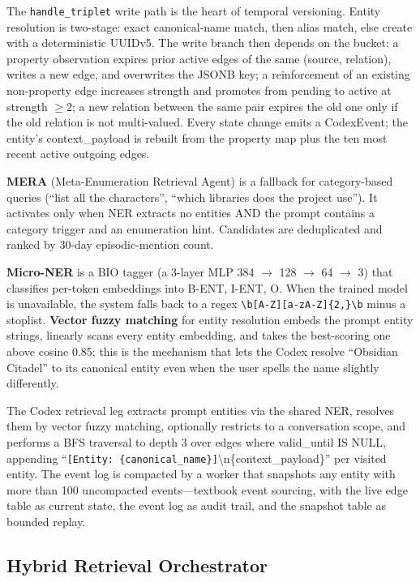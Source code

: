\documentclass[11pt,a4paper]{article}
\begin{document}
The \texttt{handle\_triplet} write path is the heart of temporal versioning. Entity resolution is two-stage: exact canonical-name match, then alias match, else create with a deterministic UUIDv5. The write branch then depends on the bucket: a property observation expires prior active edges of the same (source, relation), writes a new edge, and overwrites the JSONB key; a reinforcement of an existing non-property edge increases strength and promotes from pending to active at strength $\geq 2$; a new relation between the same pair expires the old one only if the old relation is not multi-valued. Every state change emits a CodexEvent; the entity's context\_payload is rebuilt from the property map plus the ten most recent active outgoing edges.

\textbf{MERA} (Meta-Enumeration Retrieval Agent) is a fallback for category-based queries (``list all the characters'', ``which libraries does the project use''). It activates only when NER extracts no entities AND the prompt contains a category trigger and an enumeration hint. Candidates are deduplicated and ranked by 30-day episodic-mention count.

\textbf{Micro-NER} is a BIO tagger (a 3-layer MLP 384 $\rightarrow$ 128 $\rightarrow$ 64 $\rightarrow$ 3) that classifies per-token embeddings into B-ENT, I-ENT, O. When the trained model is unavailable, the system falls back to a regex \texttt{\textbackslash b[A-Z][a-zA-Z]\{2,\}\textbackslash b} minus a stoplist. \textbf{Vector fuzzy matching} for entity resolution embeds the prompt entity strings, linearly scans every entity embedding, and takes the best-scoring one above cosine 0.85; this is the mechanism that lets the Codex resolve ``Obsidian Citadel'' to its canonical entity even when the user spells the name slightly differently.

The Codex retrieval leg extracts prompt entities via the shared NER, resolves them by vector fuzzy matching, optionally restricts to a conversation scope, and performs a BFS traversal to depth 3 over edges where valid\_until IS NULL, appending ``\texttt{[Entity: \{canonical\_name\}]}\textbackslash n\{context\_payload\}'' per visited entity. The event log is compacted by a worker that snapshots any entity with more than 100 uncompacted events---textbook event sourcing, with the live edge table as current state, the event log as audit trail, and the snapshot table as bounded replay.

\subsection{Hybrid Retrieval Orchestrator}
\end{document}
